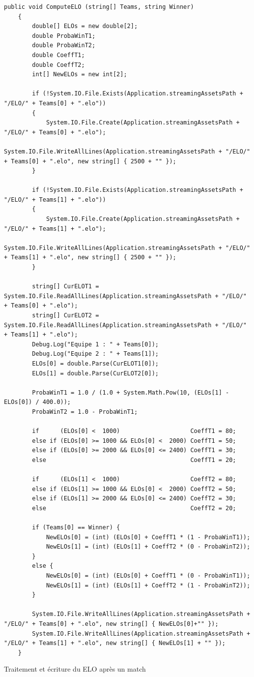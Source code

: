 \documentclass{report}
\begin{document}
\begin{lstlisting}[frame=single]
   public void ComputeELO (string[] Teams, string Winner)
    {
        double[] ELOs = new double[2];
        double ProbaWinT1;
        double ProbaWinT2;
        double CoeffT1;
        double CoeffT2;
        int[] NewELOs = new int[2];

        if (!System.IO.File.Exists(Application.streamingAssetsPath + "/ELO/" + Teams[0] + ".elo"))
        {
            System.IO.File.Create(Application.streamingAssetsPath + "/ELO/" + Teams[0] + ".elo");
            System.IO.File.WriteAllLines(Application.streamingAssetsPath + "/ELO/" + Teams[0] + ".elo", new string[] { 2500 + "" });
        }

        if (!System.IO.File.Exists(Application.streamingAssetsPath + "/ELO/" + Teams[1] + ".elo"))
        {
            System.IO.File.Create(Application.streamingAssetsPath + "/ELO/" + Teams[1] + ".elo");
            System.IO.File.WriteAllLines(Application.streamingAssetsPath + "/ELO/" + Teams[1] + ".elo", new string[] { 2500 + "" });
        }

        string[] CurELOT1 = System.IO.File.ReadAllLines(Application.streamingAssetsPath + "/ELO/" + Teams[0] + ".elo");
        string[] CurELOT2 = System.IO.File.ReadAllLines(Application.streamingAssetsPath + "/ELO/" + Teams[1] + ".elo");
        Debug.Log("Equipe 1 : " + Teams[0]);
        Debug.Log("Equipe 2 : " + Teams[1]);
        ELOs[0] = double.Parse(CurELOT1[0]);
        ELOs[1] = double.Parse(CurELOT2[0]);
        
        ProbaWinT1 = 1.0 / (1.0 + System.Math.Pow(10, (ELOs[1] - ELOs[0]) / 400.0));
        ProbaWinT2 = 1.0 - ProbaWinT1;
            
        if      (ELOs[0] <  1000)                    CoeffT1 = 80;
        else if (ELOs[0] >= 1000 && ELOs[0] <  2000) CoeffT1 = 50;
        else if (ELOs[0] >= 2000 && ELOs[0] <= 2400) CoeffT1 = 30;
        else                                         CoeffT1 = 20;
                
        if      (ELOs[1] <  1000)                    CoeffT2 = 80;
        else if (ELOs[1] >= 1000 && ELOs[0] <  2000) CoeffT2 = 50;
        else if (ELOs[1] >= 2000 && ELOs[0] <= 2400) CoeffT2 = 30;
        else                                         CoeffT2 = 20;
            
        if (Teams[0] == Winner) {
            NewELOs[0] = (int) (ELOs[0] + CoeffT1 * (1 - ProbaWinT1));
            NewELOs[1] = (int) (ELOs[1] + CoeffT2 * (0 - ProbaWinT2));
        }
        else {
            NewELOs[0] = (int) (ELOs[0] + CoeffT1 * (0 - ProbaWinT1));
            NewELOs[1] = (int) (ELOs[1] + CoeffT2 * (1 - ProbaWinT2));
        }
                     
        System.IO.File.WriteAllLines(Application.streamingAssetsPath + "/ELO/" + Teams[0] + ".elo", new string[] { NewELOs[0]+"" });
        System.IO.File.WriteAllLines(Application.streamingAssetsPath + "/ELO/" + Teams[1] + ".elo", new string[] { NewELOs[1] + "" });
    }

\end{lstlisting}
 {Traitement et écriture du ELO après un match}
\end{document}
